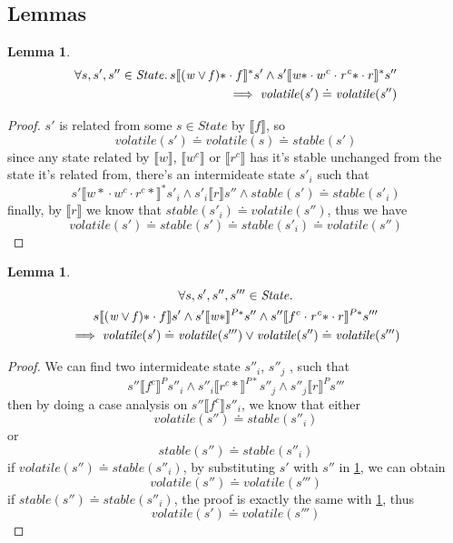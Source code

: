\documentclass[a4paper,11pt]{article}
\newtheorem{lemma}[theorem]{Lemma}
\theoremstyle{definition}
\begin{document}
\subsection{Lemmas}

\begin{lemma} \label{lemma-2-1}
\begin{align*}
	\forall s, s', s'' \in \mathit{State} \ldotp s \llbracket \mathit{(w \lor f)\ast} \cdot f \rrbracket^* s' \land s' \llbracket \mathit{w\ast} \cdot w^c \cdot \mathit{r^c\ast} \cdot r \rrbracket^* s'' \\
	  \implies \mathit{volatile(s')} \doteq \mathit{volatile(s'')}
\end{align*}
\end{lemma}
\begin{proof}
	$s'$ is related from some $s \in \mathit{State}$ by $\llbracket f \rrbracket$, so
		$$\mathit{volatile(s')} \doteq \mathit{volatile(s)} \doteq \mathit{stable(s')}$$
	since any state related by $\llbracket w \rrbracket$, $\llbracket w^c \rrbracket$ or $\llbracket r^c \rrbracket$ has it's stable unchanged from the state it's related from, there's an intermideate state $s'_i$ such that
		$$s' \llbracket {w*} \cdot w^c \cdot {r^c *} \rrbracket^* s'_i \land s'_i \llbracket r \rrbracket s'' \land stable(s') \doteq stable(s'_i)$$
	finally, by $\llbracket r \rrbracket$ we know that $\mathit{stable(s'_i) \doteq volatile(s'')}$, thus we have
		$$\mathit{volatile(s') \doteq stable(s') \doteq stable(s'_i) \doteq volatile(s'')}$$
\end{proof}

\begin{lemma} \label{lemma-2-2}
\begin{multline*}
      \forall s, s', s'', s''' \in \mathit{State} \ldotp \\
      s \llbracket \mathit{(w \lor f)\ast} \cdot f \rrbracket s' \land
	  s' \llbracket \mathit{w\ast} \rrbracket^{P*} s'' \land
	  s'' \llbracket f^c \cdot \mathit{r^c\ast} \cdot r \rrbracket^{P*} s'''\\ \implies \mathit{volatile(s')} \doteq \mathit{volatile(s''')} \lor \mathit{volatile(s'')} \doteq \mathit{volatile(s''')}
\end{multline*}
\end{lemma}
\begin{proof}
	We can find two intermideate state $s''_i$, $s''_j$ , such that $$s'' \llbracket f^c \rrbracket^P s''_i \land s''_i \llbracket r^c* \rrbracket^{P*} s''_j \land s''_j \llbracket r \rrbracket^P s'''$$
	then by doing a case analysis on $s'' \llbracket f^c \rrbracket s''_i$, we know that either $$\mathit{volatile(s'') \doteq stable(s''_i)}$$ or $$\mathit{stable(s'') \doteq stable(s''_i)}$$
	if $\mathit{volatile(s'') \doteq stable(s''_i)}$, by substituting $s'$ with $s''$ in \ref{lemma-2-1}, we can obtain $$\mathit{volatile(s'') \doteq volatile(s''')}$$
	if $\mathit{stable(s'') \doteq stable(s''_i)}$, the proof is exactly the same with \ref{lemma-2-1}, thus $$\mathit{volatile(s') \doteq volatile(s''')}$$
\end{proof}
\end{document}
